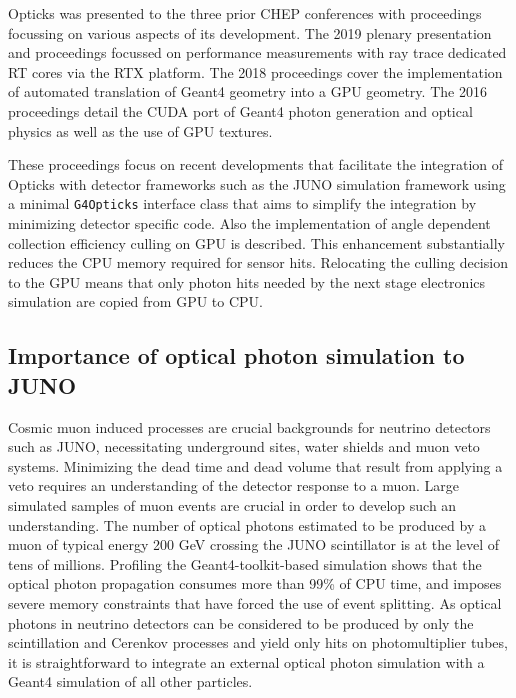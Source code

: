 \documentclass{webofc}
\begin{document}
Opticks was presented to the three prior CHEP conferences with proceedings
focussing on various aspects of its development. The 2019 plenary presentation 
and proceedings\cite{chep2019} focussed on performance measurements with ray trace dedicated RT cores via the RTX platform. 
The 2018 proceedings\cite{chep2018} cover the implementation of automated
translation of Geant4 geometry into a GPU geometry.
The 2016 proceedings\cite{chep2016} detail the CUDA port of Geant4 photon generation 
and optical physics as well as the use of GPU textures. 
%

These proceedings focus on recent developments that facilitate the integration of Opticks 
with detector frameworks such as the JUNO simulation framework\cite{junosim} using a minimal 
{\tt G4Opticks} interface class that aims to simplify the integration 
by minimizing detector specific code. Also the implementation of angle dependent 
collection efficiency culling on GPU is described. This enhancement substantially 
reduces the CPU memory required for sensor hits.  Relocating the culling 
decision to the GPU means that only photon hits needed by the next stage electronics simulation 
are copied from GPU to CPU. 
%
\subsection{Importance of optical photon simulation to JUNO}%
%
%
Cosmic muon induced processes are crucial backgrounds for neutrino
detectors such as JUNO\cite{juno},
necessitating underground sites, water shields and muon veto systems.
Minimizing the dead time and dead volume that result from applying
a veto requires an understanding of the detector response to a muon.
Large simulated samples of muon events are crucial in order to
develop such an understanding.
%
The number of optical photons estimated to be produced by a muon of
typical energy 200 GeV crossing the JUNO scintillator is at the level of tens of millions.
Profiling the Geant4-toolkit-based simulation shows that the optical photon propagation 
consumes more than 99\% of CPU time, and imposes severe memory constraints that have forced
the use of event splitting.  
%
As optical photons in neutrino detectors can be considered to be produced
by only the scintillation and Cerenkov processes and yield only hits
on photomultiplier tubes, it is straightforward to integrate an
external optical photon simulation with a Geant4 simulation of all other particles.
%
\end{document}
